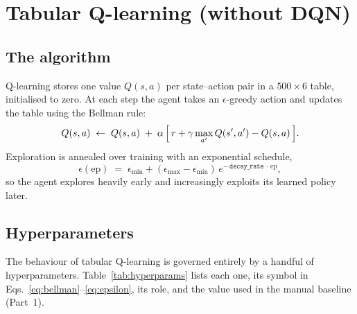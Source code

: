 \documentclass[11pt]{article}
\begin{document}
\section{Tabular Q-learning (without DQN)}

\subsection{The algorithm}
Q-learning stores one value $Q(s,a)$ per state--action pair in a
$500 \times 6$ table, initialised to zero. At each step the agent takes an
$\epsilon$-greedy action and updates the table using the Bellman rule:
\begin{equation}
  Q(s,a) \;\leftarrow\; Q(s,a) \;+\; \alpha\,\Bigl[\,r + \gamma \max_{a'} Q(s',a') - Q(s,a)\,\Bigr].
  \label{eq:bellman}
\end{equation}
Exploration is annealed over training with an exponential schedule,
\begin{equation}
  \epsilon(\text{ep}) \;=\; \epsilon_{\min} + (\epsilon_{\max} - \epsilon_{\min})\,
  e^{-\,\texttt{decay\_rate}\,\cdot\,\text{ep}} ,
  \label{eq:epsilon}
\end{equation}
so the agent explores heavily early and increasingly exploits its learned policy later.

\subsection{Hyperparameters}
\label{sec:hyperparameters}
The behaviour of tabular Q-learning is governed entirely by a handful of hyperparameters.
Table~\ref{tab:hyperparams} lists each one, its symbol in Eqs.~\eqref{eq:bellman}--\eqref{eq:epsilon},
its role, and the value used in the manual baseline (Part~1).
\end{document}
